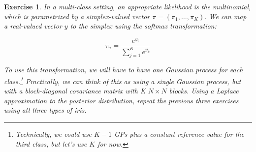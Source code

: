 \documentclass[twoside]{article}
\newcounter{lecnum}
\newtheorem{exercise}{Exercise}[lecnum]
\begin{document}
 \begin{exercise}
   In a multi-class setting, an appropriate likelihood is the multinomial, which is parametrized by a simplex-valued vector $\pi = (\pi_1,\dots, \pi_K)$. We can map a real-valued vector $y$ to the simplex using the softmax transformation:

   $$\pi_i = \frac{e^{y_i}}{\sum_{j=1}^K e^{y_k}}$$

   To use this transformation, we will have to have one Gaussian process for each class.\footnote{Technically, we could use $K-1$ GPs plus a constant reference value for the third class, but let's use $K$ for now.} Practically, we can think of this as using a single Gaussian process, but with a block-diagonal covariance matrix with K $N\times N$ blocks. Using a Laplace approximation to the posterior distribution, repeat the previous three exercises using all three types of iris.
   \end{exercise}
   
 




  
  
\end{document}
